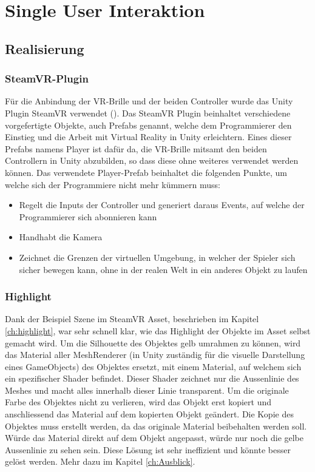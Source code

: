 \chapter{Single User Interaktion}
\label{ch:Single_User_Interaktion}

\section{Realisierung}

\subsection{SteamVR-Plugin}
\label{ch:steamvr_plugin}

Für die Anbindung der VR-Brille und der beiden Controller wurde das Unity Plugin SteamVR verwendet (\cite{noauthor_steamvr_2019}). Das SteamVR Plugin beinhaltet verschiedene vorgefertigte Objekte, auch Prefabs genannt, welche dem Programmierer den Einstieg und die Arbeit mit Virtual Reality in Unity erleichtern. Eines dieser Prefabs namens \grqq Player\grqq{} ist dafür da, die VR-Brille mitsamt den beiden Controllern in Unity abzubilden, so dass diese ohne weiteres verwendet werden können. 
Das verwendete \grqq Player\grqq-Prefab beinhaltet die folgenden Punkte, um welche sich der Programmiere nicht mehr kümmern muss:

\begin{itemize} [itemsep=1pt,topsep=0pt]
	\item Regelt die Inputs der Controller und generiert daraus Events, auf welche der Programmierer sich abonnieren kann
	\item Handhabt die Kamera
	\item Zeichnet die Grenzen der virtuellen Umgebung, in welcher der Spieler sich sicher bewegen kann, ohne in der realen Welt in ein anderes Objekt zu laufen
\end{itemize}
 

\subsection{Highlight}
\label{ch:highlight_realisierung}
Dank der Beispiel Szene im SteamVR Asset, beschrieben im Kapitel \ref{ch:highlight}, war sehr schnell klar, wie das Highlight der Objekte im Asset selbst gemacht wird. Um die Silhouette des Objektes gelb umrahmen zu können, wird das Material aller MeshRenderer (in Unity zuständig für die visuelle Darstellung eines GameObjects) des Objektes ersetzt, mit einem Material, auf welchem sich ein spezifischer Shader befindet. Dieser Shader zeichnet nur die Aussenlinie des Meshes und macht alles innerhalb dieser Linie transparent. Um die originale Farbe des Objektes nicht zu verlieren, wird das Objekt erst kopiert und anschliessend das Material auf dem kopierten Objekt geändert. Die Kopie des Objektes muss erstellt werden, da das originale Material beibehalten werden soll. Würde das Material direkt auf dem Objekt angepasst, würde nur noch die gelbe Aussenlinie zu sehen sein. Diese Lösung ist sehr ineffizient und könnte besser gelöst werden. Mehr dazu im Kapitel \ref{ch:Ausblick}. \\

